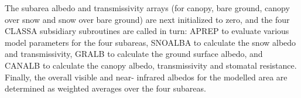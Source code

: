 The subarea albedo and transmissivity arrays (for canopy, bare ground, canopy over snow and snow over bare ground) are next initialized to zero, and the four C\+L\+A\+S\+S\+A subsidiary subroutines are called in turn\+: A\+P\+R\+E\+P to evaluate various model parameters for the four subareas, S\+N\+O\+A\+L\+B\+A to calculate the snow albedo and transmissivity, G\+R\+A\+L\+B to calculate the ground surface albedo, and C\+A\+N\+A\+L\+B to calculate the canopy albedo, transmissivity and stomatal resistance. Finally, the overall visible and near-\/ infrared albedos for the modelled area are determined as weighted averages over the four subareas.